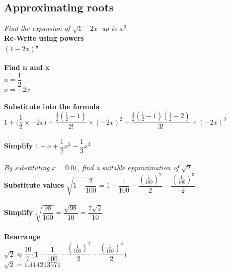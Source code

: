 \documentclass{article}[18pt]
\begin{document}
\subsection{Approximating roots}
\textit{Find the expansion of $\sqrt{1-2x}$ up to $x^3$}\\
\textbf{Re-Write using powers}\\
$(1-2x)^{\frac{1}{2}}$\\
\\
\textbf{Find n and x}\\
$n=\dfrac{1}{2}$\\
$x=-2x$\\
\\
\textbf{Substitute into the formula}\\
$1+\Bigg(\dfrac{1}{2}\times-2x\Bigg)+\dfrac{\frac{1}{2}(\frac{1}{2}-1)}{2!}\times(-2x)^2+\dfrac{\frac{1}{2}(\frac{1}{2}-1)(\frac{1}{2}-2)}{3!}\times(-2x)^3$\\
\\
\textbf{Simplify}
$1-x+\dfrac{1}{2}x^2-\dfrac{1}{3}x^3$\\
\\
\textit{By substituting $x=0.01$, find a suitable approximation of $\sqrt{2}$}\\
\textbf{Substitute values}
$\sqrt{1-\dfrac{2}{100}}=1-\dfrac{1}{100}-\dfrac{(\frac{1}{100})^2}{2}-\dfrac{(\frac{1}{100})^3}{2}$\\
\\
\textbf{Simplify}
$\sqrt{\dfrac{98}{100}}=\dfrac{\sqrt{98}}{10}=\dfrac{7\sqrt{2}}{10}$\\
\\
\textbf{Rearrange}\\
$\sqrt{2}\approx\dfrac{10}{7}\Bigg(1-\dfrac{1}{100}-\dfrac{(\frac{1}{100})^2}{2}-\dfrac{(\frac{1}{100})^3}{2}\Bigg)$\\
$\sqrt{2}=1.414213571$
\end{document}
